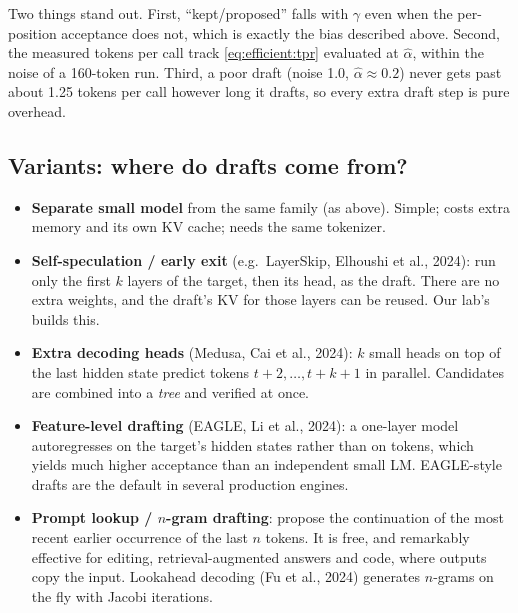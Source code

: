 Two things stand out. First, ``kept/proposed'' falls with $\gamma$ even when the
per-position acceptance does not, which is exactly the bias described above. Second,
the measured tokens per call track \cref{eq:efficient:tpr} evaluated at $\hat\alpha$,
within the noise of a 160-token run. Third, a poor draft (noise 1.0, $\hat\alpha\approx0.2$)
never gets past about 1.25 tokens per call however long it drafts, so every extra draft
step is pure overhead.

\subsection{Variants: where do drafts come from?}
\begin{itemize}
  \item \textbf{Separate small model} from the same family (as above). Simple; costs extra
        memory and its own KV cache; needs the same tokenizer.
  \item \textbf{Self-speculation / early exit} (e.g.\ LayerSkip, Elhoushi et al., 2024): run only
        the first $k$ layers of the target, then its head, as the draft. There are no
        extra weights, and the draft's KV for those layers can be reused. Our lab's
         builds this.
  \item \textbf{Extra decoding heads} (Medusa, Cai et al., 2024): $k$ small heads on top of
        the last hidden state predict tokens $t+2,\dots,t+k+1$ in parallel. Candidates are
        combined into a \emph{tree} and verified at once.
  \item \textbf{Feature-level drafting} (EAGLE, Li et al., 2024): a one-layer model
        autoregresses on the target's hidden states rather than on tokens, which yields
        much higher acceptance than an independent small LM. EAGLE-style drafts are the
        default in several production engines.
  \item \textbf{Prompt lookup / $n$-gram drafting}: propose the continuation of the most recent
        earlier occurrence of the last $n$ tokens. It is free, and remarkably effective for
        editing, retrieval-augmented answers and code, where outputs copy the input.
        Lookahead decoding (Fu et al., 2024) generates $n$-grams on the fly with Jacobi
        iterations.
\end{itemize}

